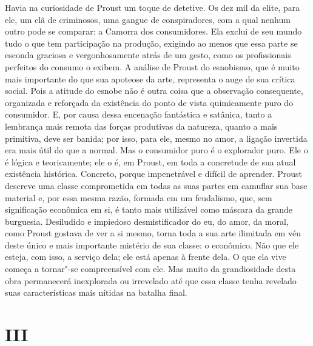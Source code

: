 Havia na curiosidade de Proust um toque de detetive. Os dez mil da
elite, para ele, um clã de criminosos, uma gangue de conspiradores, com
a qual nenhum outro pode se comparar: a Camorra dos consumidores. Ela
exclui de seu mundo tudo o que tem participação na produção, exigindo ao
menos que essa parte se esconda graciosa e vergonhosamente atrás de um
gesto, como os profissionais perfeitos do consumo o exibem. A análise de
Proust do esnobismo, que é muito mais importante do que sua apoteose da
arte, representa o auge de sua crítica social. Pois a atitude do esnobe
não é outra coisa que a observação consequente, organizada e reforçada
da existência do ponto de vista quimicamente puro do consumidor. E, por
causa dessa encenação fantástica e satânica, tanto a lembrança mais
remota das forças produtivas da natureza, quanto a mais primitiva, deve
ser banida; por isso, para ele, mesmo no amor, a ligação invertida era
mais útil do que a normal. Mas o consumidor puro é o explorador puro.
Ele o é lógica e teoricamente; ele o é, em Proust, em toda a concretude
de sua atual existência histórica. Concreto, porque impenetrável e
difícil de aprender. Proust descreve uma classe comprometida em todas as
suas partes em camuflar sua base material e, por essa mesma razão,
formada em um feudalismo, que, sem significação econômica em si, é tanto
mais utilizável como máscara da grande burguesia. Desiludido e impiedoso
desmistificador do eu, do amor, da moral, como Proust gostava de ver a
si mesmo, torna toda a sua arte ilimitada em véu deste único e mais
importante mistério de sua classe: o econômico. Não que ele esteja, com
isso, a serviço dela; ele está apenas à frente dela. O que ela vive
começa a tornar"-se compreensível com ele. Mas muito da grandiosidade
desta obra permanecerá inexplorada ou irrevelado até que essa classe
tenha revelado suas características mais nítidas na batalha final.

\section{III}

